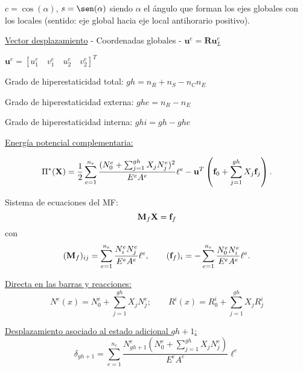 \vspace{-0.2cm}
$c=\cos(\alpha)$, $s=\sen(\alpha)$ siendo $\alpha$ el ángulo que forman los ejes globales con los locales (sentido: eje global hacia eje local antihorario positivo).

\vspace{0.3cm}
\underline{Vector desplazamiento} - Coordenadas globales - $\textbf{u}^e=\textbf{R} \textbf{u}_ L^e$

\vspace{0.3cm}
$\textbf{u}^e=[u_1^e \quad v_1^e  \quad u_2^e \quad v_2^e]^T$ \centering


\begin{center}
\end{center}


Grado de hiperestaticidad total: $gh=n_R + n_S - n_C n_E$\raggedright

Grado de hiperestaticidad externa: $ghe=n_R - n_E$

Grado de hiperestaticidad interna: $ghi=gh - ghe$

\vspace{0.3cm}
\underline{Energía potencial complementaria:}\raggedright

$$
\Pi^* ({\bf X}) = \frac{1}{2}  \sum_{e=1}^{n_e} \frac{(N_0^e + \sum_{j=1}^{gh} X_j N_j^e)^2}{E^e A^e} \ell^e - {\bf u}^T \left( {\bf f}_0 +  \sum_{j=1}^{gh} X_j {\bf f}_j \right).
$$


Sistema de ecuaciones del MF:
$$
{\bf M}_f {\bf X} = {\bf f}_f
$$
%
con
$$
({\bf M}_f)_{ij} =  \sum_{e=1}^{n_e} \frac{N_i^e N_j^e }{E^e A^e} \ell^e,
\qquad
({\bf f}_f)_{i} =  - \sum_{e=1}^{n_e} \frac{N_0^e N_i^e }{E^e A^e} \ell^e.
$$

\underline{Directa en las barras y reacciones:}
$$
N^e (x)=N_0^e +  \sum_{j=1}^{gh} X_j N_j^e ;
\qquad
R^i(x)=R_0^i +  \sum_{j=1}^{gh} X_j R_j^i
$$

\underline{Desplazamiento asociado al estado adicional $gh+1$:}
$$
\delta_{gh+1}= \sum_{e=1}^{n_e} \frac{N_{gh+1}^e (N_0^e + \sum_{j=1}^{gh} X_j N_j^e)}{E^e A^e} \ell^e 
$$

\begin{center}
\end{center}

\begin{center}
 \def\svgwidth{0.75\textwidth}
 
\end{center}

